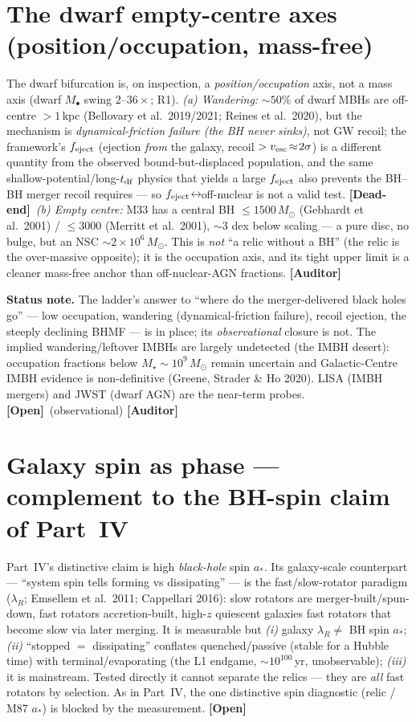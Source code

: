 \documentclass[11pt]{article}
\newcommand{\Dead}{\textbf{\textcolor{red!65!black}{[Dead-end]}}}
\newcommand{\Open}{\textbf{\textcolor{gray!10!black}{[Open]}}}
\newcommand{\Auditor}{\textbf{\textcolor{teal!55!black}{[Auditor]}}}
\newcommand{\msun}{M_\odot}
\newcommand{\Mbh}{M_{\bullet}}
\begin{document}
\section{The dwarf empty-centre axes (position/occupation, mass-free)}
The dwarf bifurcation is, on inspection, a \emph{position/occupation} axis, not a mass axis (dwarf $\Mbh$ swing $2$--$36\times$; R1). \emph{(a) Wandering:} $\sim50\%$ of dwarf MBHs are off-centre $>1$\,kpc (Bellovary et al.\ 2019/2021; Reines et al.\ 2020), but the mechanism is \emph{dynamical-friction failure (the BH never sinks)}, not GW recoil; the framework's $f_{\rm eject}$ (ejection \emph{from} the galaxy, recoil $>v_{\rm esc}\!\approx\!2\sigma$) is a different quantity from the observed bound-but-displaced population, and the same shallow-potential/long-$t_{\rm df}$ physics that yields a large $f_{\rm eject}$ also prevents the BH--BH merger recoil requires --- so $f_{\rm eject}\!\leftrightarrow\!$off-nuclear is not a valid test. \Dead\ \emph{(b) Empty centre:} M33 has a central BH $\le1500\,\msun$ (Gebhardt et al.\ 2001) / $\le3000$ (Merritt et al.\ 2001), $\sim3$ dex below scaling --- a pure disc, no bulge, but an NSC $\sim2\times10^6\,\msun$. This is \emph{not} ``a relic without a BH'' (the relic is the over-massive opposite); it is the occupation axis, and its tight upper limit is a cleaner mass-free anchor than off-nuclear-AGN fractions. \Auditor



\textbf{Status note.} The ladder's answer to ``where do the merger-delivered black holes go'' --- low occupation, wandering (dynamical-friction failure), recoil ejection, the steeply declining BHMF --- is in place; its \emph{observational} closure is not. The implied wandering/leftover IMBHs are largely undetected (the IMBH desert): occupation fractions below $M_\star\!\sim\!10^9\,\msun$ remain uncertain and Galactic-Centre IMBH evidence is non-definitive (Greene, Strader \& Ho 2020). LISA (IMBH mergers) and JWST (dwarf AGN) are the near-term probes. \Open\ (observational) \Auditor

\section{Galaxy spin as phase --- complement to the BH-spin claim of Part~IV}
Part~IV's distinctive claim is high \emph{black-hole} spin $a_\ast$. Its galaxy-scale counterpart --- ``system spin tells forming vs dissipating'' --- is the fast/slow-rotator paradigm ($\lambda_R$; Emsellem et al.\ 2011; Cappellari 2016): slow rotators are merger-built/spun-down, fast rotators accretion-built, high-$z$ quiescent galaxies fast rotators that become slow via later merging. It is measurable but \emph{(i)} galaxy $\lambda_R\!\neq\!$ BH spin $a_\ast$; \emph{(ii)} ``stopped $=$ dissipating'' conflates quenched/passive (stable for a Hubble time) with terminal/evaporating (the L1 endgame, $\sim10^{100}$\,yr, unobservable); \emph{(iii)} it is mainstream. Tested directly it cannot separate the relics --- they are \emph{all} fast rotators by selection. As in Part~IV, the one distinctive spin diagnostic (relic / M87 $a_\ast$) is blocked by the measurement. \Open
\end{document}
